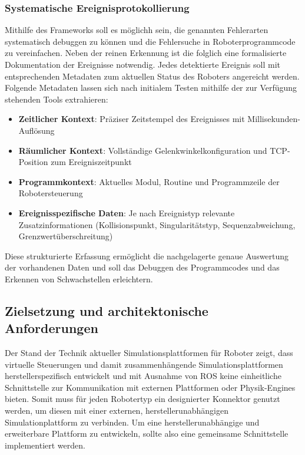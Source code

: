 \subsubsection{Systematische Ereignisprotokollierung}

Mithilfe des Frameworks soll es möglichh sein, die genannten Fehlerarten
systematisch debuggen zu können und die Fehlersuche in Roboterprogrammcode zu
vereinfachen. Neben der reinen Erkennung ist die folglich eine formalisierte
Dokumentation der Ereignisse notwendig. Jedes detektierte Ereignis soll mit
entsprechenden Metadaten zum aktuellen Status des Roboters angereicht werden.
Folgende Metadaten lassen sich nach initialem Testen mithilfe der zur Verfügung
stehenden Tools extrahieren:

\begin{itemize}
	\item \textbf{Zeitlicher Kontext}: Präziser Zeitstempel des Ereignisses mit Millisekunden-Auflösung
	\item \textbf{Räumlicher Kontext}: Vollständige Gelenkwinkelkonfiguration und TCP-Position zum Ereigniszeitpunkt
	\item \textbf{Programmkontext}: Aktuelles Modul, Routine und Programmzeile der Robotersteuerung
	\item \textbf{Ereignisspezifische Daten}: Je nach Ereignistyp relevante Zusatzinformationen (Kollisionspunkt, Singularitätstyp, Sequenzabweichung, Grenzwertüberschreitung)
\end{itemize}
\noindent
Diese strukturierte Erfassung ermöglicht die nachgelagerte genaue Auswertung der
vorhandenen Daten und soll das Debuggen des Programmcodes und das Erkennen von
Schwachstellen erleichtern.

\subsection{Zielsetzung und architektonische Anforderungen}
Der Stand der Technik aktueller Simulationsplattformen für Roboter zeigt, dass
virtuelle Steuerungen und damit zusammenhängende Simulationsplattformen
herstellerspezifisch entwickelt und mit Ausnahme von ROS keine einheitliche
Schnittstelle zur Kommunikation mit externen Plattformen oder Physik-Engines
bieten. Somit muss für jeden Robotertyp ein designierter Konnektor genutzt
werden, um diesen mit einer externen, herstellerunabhängigen Simulationplattform
zu verbinden. Um eine herstellerunabhängige und erweiterbare Plattform zu
entwickeln, sollte also eine gemeinsame Schnittstelle implementiert werden.\\

